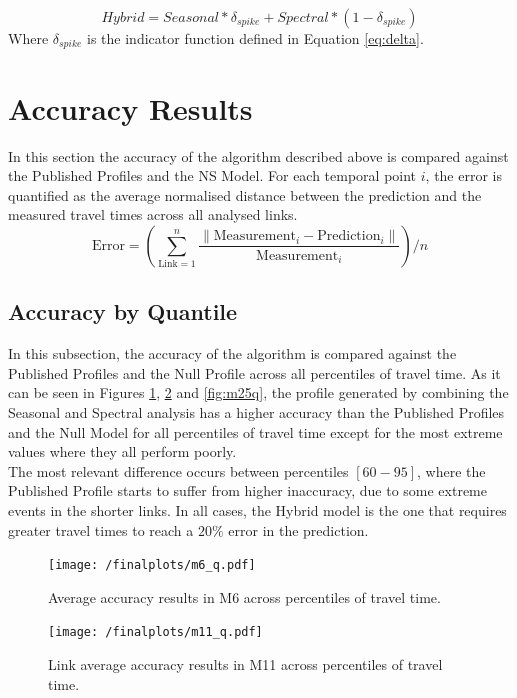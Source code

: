 \documentclass[conference]{IEEEtran}
\begin{document}
\begin{equation}
Hybrid = Seasonal * \delta_{spike} + Spectral * (1 - \delta_{spike})
\end{equation}
Where $\delta_{spike}$ is the indicator function defined in Equation \eqref{eq:delta}.

\section{Accuracy Results}
In this section the accuracy of the algorithm described above is compared against the Published Profiles and the NS Model. 
For each temporal point $i$, the error is quantified as the average normalised distance between the prediction and the measured travel times across all analysed links.
\begin{equation}
\textrm{Error} = \left( \sum_{\textrm{Link}=1}^{n} \frac{\|\textrm{Measurement}_i - \textrm{Prediction}_i\|}{\textrm{Measurement}_i}\right) /n 
\end{equation}
\subsection{Accuracy by Quantile}
In this subsection, the accuracy of the algorithm is compared against the Published Profiles and the Null Profile across all percentiles of travel time.
As it can be seen in Figures \ref{fig:m6q}, \ref{fig:m11q} and \ref{fig:m25q}, the profile generated by combining the Seasonal and Spectral analysis has a higher accuracy than the Published Profiles and the Null Model for all percentiles of travel time except for the most extreme values where they all perform poorly.\\
The most relevant difference occurs between percentiles $[60-95]$, where the Published Profile starts to suffer from higher inaccuracy, due to some extreme events in the shorter links. 
In all cases, the Hybrid model is the one that requires greater travel times to reach a $20\%$ error in the prediction.
\begin{figure}[htbp]
	\centerline{\texttt{[image: /finalplots/m6\_q.pdf]}}
	\caption{Average accuracy results in M6 across percentiles of travel time.}
	\label{fig:m6q}
\end{figure}

\begin{figure}[htbp]
	\centering
	\texttt{[image: /finalplots/m11\_q.pdf]}
	\caption{Link average accuracy results in M11 across percentiles of travel time.}
	\label{fig:m11q}
\end{figure}
\end{document}
